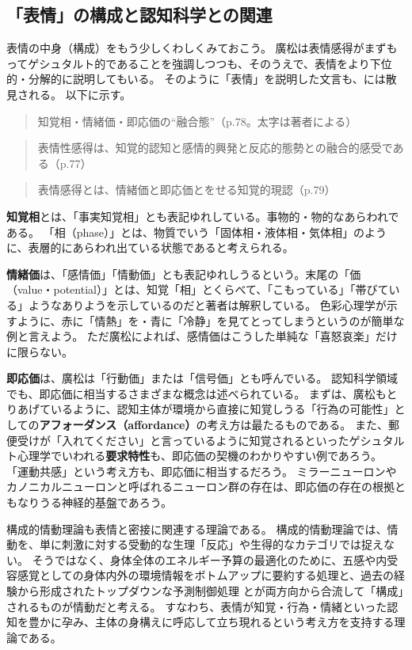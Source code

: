 \subsection{「表情」の構成と認知科学との関連}
表情の中身（構成）をもう少しくわしくみておこう。
廣松\cite{hiromatsu:1989}は表情感得がまずもってゲシュタルト的であることを強調しつつも、そのうえで、表情をより下位的・分解的に説明してもいる。
そのように「表情」を説明した文言も、\cite{hiromatsu:1989}には散見される。
以下に示す。
\begin{quote}
  知覚相・情緒価・即応価の“融合態”（p.78。太字は著者による）
\end{quote}
\begin{quote}
  表情性感得は、知覚的認知と感情的興発と反応的態勢との融合的感受である（p.77）
\end{quote}
\begin{quote}
  表情感得とは、情緒価と即応価とをせる知覚的現認（p.79）
\end{quote}

\textbf{知覚相}とは、「事実知覚相」とも表記ゆれしている。事物的・物的なあらわれである。
「相（phase）」とは、物質でいう「固体相・液体相・気体相」のように、表層的にあらわれ出ている状態であると考えられる。

\textbf{情緒価}は、「感情価」「情動価」とも表記ゆれしうるという。末尾の「価（value・potential）」とは、知覚「相」とくらべて、「こもっている」「帯びている」ようなありようを示しているのだと著者は解釈している。
色彩心理学が示すように、赤に「情熱」を・青に「冷静」を見てとってしまうというのが簡単な例と言えよう。
ただ廣松によれば、感情価はこうした単純な「喜怒哀楽」だけに限らない。

\textbf{即応価}は、廣松は「行動価」または「信号価」とも呼んでいる。
認知科学領域でも、即応価に相当するさまざまな概念は述べられている。
まずは、廣松もとりあげているように、認知主体が環境から直接に知覚しうる「行為の可能性」としての\textbf{アフォーダンス（affordance）}\cite{gibson:1979}の考え方は最たるものである。
また、郵便受けが「入れてください」と言っているように知覚されるといったゲシュタルト心理学でいわれる\textbf{要求特性}\cite{kofka:1935}も、即応価の契機のわかりやすい例であろう。
「運動共感」という考え方\cite{kaneko:2005}も、即応価に相当するだろう。
ミラーニューロン\cite{Rizzolatti:2004}やカノニカルニューロンと呼ばれるニューロン群の存在は、即応価の存在の根拠ともなりうる神経的基盤であろう。

構成的情動理論\cite{barret_2017}も表情と密接に関連する理論である。
構成的情動理論では、情動を、単に刺激に対する受動的な生理「反応」や生得的なカテゴリでは捉えない。
そうではなく、身体全体のエネルギー予算の最適化のために、五感や内受容感覚としての身体内外の環境情報をボトムアップに要約する処理と、過去の経験から形成されたトップダウンな予測制御処理
とが両方向から合流して「構成」されるものが情動だと考える。
すなわち、表情が知覚・行為・情緒といった認知を豊かに孕み、主体の身構えに呼応して立ち現れるという考え方を支持する理論である。

